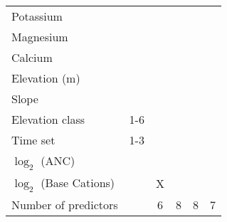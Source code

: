\begin{table}[htbp]
\begin{tabular}{lccccc}
Potassium                       &                  &                                                     &                                                      &                                                                &  \\ 
Magnesium                     &                  &                                                     &                                                      &                                                                &  \\ 
Calcium                           &                  &                                                     &                                                      &                                                                &  \\ 
Elevation (m)                  &                  &                                                     &                                                      &                                                                &  \\ 
Slope                               &                 &                                                     &                                                      &                                                                &  \\ 
Elevation class                &1-6            &                                                     &                                                      &                                                                &  \\ 
Time set                          & 1-3           &                                                     &                                                      &                                                                &  \\ 
$\log_2$ (ANC)               &                 &                                                     &                                                      &                                                                &  \\ 
$\log_2$ (Base Cations) &                  & X                                                 &                                                      &                                                                &  \\ \hline\noalign{\smallskip}
Number of predictors      &                 & 6                                                  & 8                                                   & 8                                                            & 7 \\ 
\bottomrule
\end{tabular}
\label{variables}
\end{table}